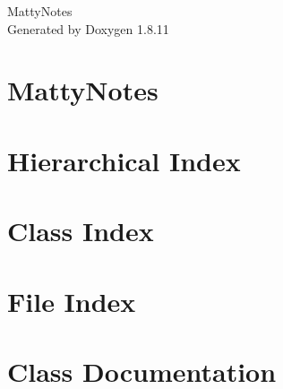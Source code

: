 \documentclass[twoside]{book}
\newcommand{\+}{\discretionary{\mbox{\scriptsize$\hookleftarrow$}}{}{}}
\newcommand{\clearemptydoublepage}{%
  \newpage{\pagestyle{empty}\cleardoublepage}%
}
\begin{document}
\hypersetup{pageanchor=false,
             bookmarksnumbered=true,
             pdfencoding=unicode
            }
\begin{titlepage}
\vspace*{7cm}
\begin{center}%
{\Large Matty\+Notes }\\
\vspace*{1cm}
{\large Generated by Doxygen 1.8.11}\\
\end{center}
\end{titlepage}
\clearemptydoublepage
\tableofcontents
\clearemptydoublepage
{}
\hypersetup{pageanchor=true}

\chapter{Matty\+Notes}
\label{md__home_matty_Документы_Qt_qt-proj_MattyNotes_README}
\hypertarget{md__home_matty_Документы_Qt_qt-proj_MattyNotes_README}{}

\chapter{Hierarchical Index}

\chapter{Class Index}

\chapter{File Index}

\chapter{Class Documentation}















\end{document}
